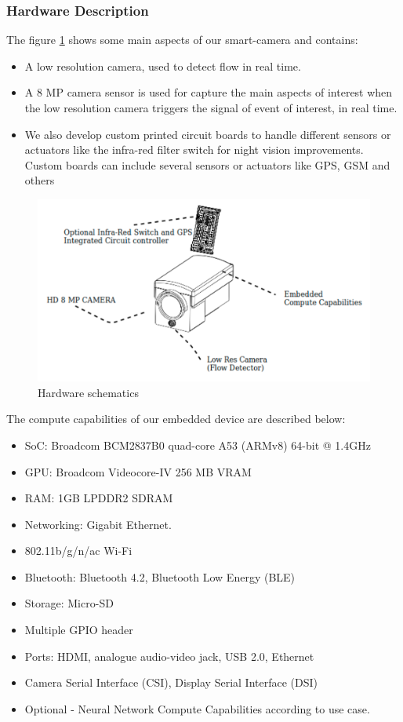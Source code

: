 \documentclass[fleqn,12pt]{SelfArx} %
\begin{document}
\subsubsection{Hardware Description}

The figure \ref{fig:hardware_dec} shows some main aspects of our smart-camera and contains:
\begin{itemize}
	\item A low resolution camera, used to detect flow in real time.
	\item A 8 MP camera sensor is used for capture the main aspects of interest when the low resolution camera triggers the signal of event of interest, in real time.
	\item We also develop custom printed circuit boards to handle different sensors or actuators like the infra-red filter switch for night vision improvements. Custom boards can include several sensors or actuators like GPS, GSM and others 
\end{itemize} 

\begin{figure}[b]\centering
	\includegraphics[width=\linewidth]{images/hardware_desc}
	\caption{Hardware schematics}
	\label{fig:hardware_dec}
\end{figure}

The compute capabilities of our embedded device are described below:

\begin{itemize}[noitemsep]

\item SoC: Broadcom BCM2837B0 quad-core A53 (ARMv8) 64-bit @ 1.4GHz
\item GPU: Broadcom Videocore-IV 256 MB VRAM
\item RAM: 1GB LPDDR2 SDRAM
\item Networking: Gigabit Ethernet.
\item 802.11b/g/n/ac Wi-Fi
\item Bluetooth: Bluetooth 4.2, Bluetooth Low Energy (BLE)
\item Storage: Micro-SD
\item Multiple GPIO header
\item Ports: HDMI, analogue audio-video jack, USB 2.0, Ethernet
\item Camera Serial Interface (CSI), Display Serial Interface (DSI)
\item Optional - Neural Network Compute Capabilities according to use case.
\end{itemize}
\end{document}
